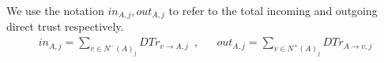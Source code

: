 \begin{definition}
\label{inouttrust}
  We use the notation $in_{A, j}, out_{A, j}$ to refer to the total incoming and outgoing direct trust respectively.
  \begin{align}
    in_{A, j} = \sum\limits_{v \in N^{-}\left(A\right)_j}DTr_{v \rightarrow A, j} \enspace,&&
    out_{A, j} = \sum\limits_{v \in N^{+}\left(A\right)_j}DTr_{A \rightarrow v, j}
  \end{align}
\end{definition}
